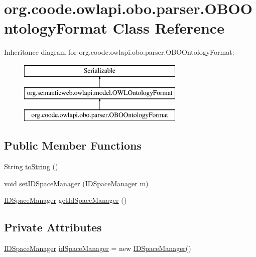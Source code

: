 \hypertarget{classorg_1_1coode_1_1owlapi_1_1obo_1_1parser_1_1_o_b_o_ontology_format}{\section{org.\-coode.\-owlapi.\-obo.\-parser.\-O\-B\-O\-Ontology\-Format Class Reference}
\label{classorg_1_1coode_1_1owlapi_1_1obo_1_1parser_1_1_o_b_o_ontology_format}
}
Inheritance diagram for org.\-coode.\-owlapi.\-obo.\-parser.\-O\-B\-O\-Ontology\-Format\-:\begin{figure}[H]
\begin{center}
\leavevmode
\includegraphics[height=3.000000cm]{classorg_1_1coode_1_1owlapi_1_1obo_1_1parser_1_1_o_b_o_ontology_format}
\end{center}
\end{figure}
\subsection*{Public Member Functions}
\begin{DoxyCompactItemize}
\item 
String \hyperlink{classorg_1_1coode_1_1owlapi_1_1obo_1_1parser_1_1_o_b_o_ontology_format_a17b4d8bc5dd09a8ac297bfff26f55ba8}{to\-String} ()
\item 
void \hyperlink{classorg_1_1coode_1_1owlapi_1_1obo_1_1parser_1_1_o_b_o_ontology_format_a4e43cfe85ff79948b5f1f48dde92eb37}{set\-I\-D\-Space\-Manager} (\hyperlink{classorg_1_1coode_1_1owlapi_1_1obo_1_1parser_1_1_i_d_space_manager}{I\-D\-Space\-Manager} m)
\item 
\hyperlink{classorg_1_1coode_1_1owlapi_1_1obo_1_1parser_1_1_i_d_space_manager}{I\-D\-Space\-Manager} \hyperlink{classorg_1_1coode_1_1owlapi_1_1obo_1_1parser_1_1_o_b_o_ontology_format_a522fa158828c01517a4adf882647030c}{get\-Id\-Space\-Manager} ()
\end{DoxyCompactItemize}
\subsection*{Private Attributes}
\begin{DoxyCompactItemize}
\item 
\hyperlink{classorg_1_1coode_1_1owlapi_1_1obo_1_1parser_1_1_i_d_space_manager}{I\-D\-Space\-Manager} \hyperlink{classorg_1_1coode_1_1owlapi_1_1obo_1_1parser_1_1_o_b_o_ontology_format_ab940db5ccb7b16c1c677d6b8130d59ab}{id\-Space\-Manager} = new \hyperlink{classorg_1_1coode_1_1owlapi_1_1obo_1_1parser_1_1_i_d_space_manager}{I\-D\-Space\-Manager}()
\end{DoxyCompactItemize}
